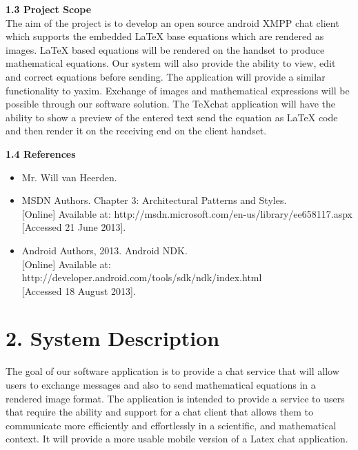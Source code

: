 \documentclass[29pt,a4paper]{moderncv}
\begin{document}
		\noindent \textbf{1.3 Project Scope}
			\\The aim of the project is to develop an open source android XMPP chat client which supports the embedded LaTeX base equations which are rendered as images. LaTeX based equations will be rendered on the handset to produce mathematical equations. Our system will also provide the ability to view, edit and correct equations before sending.
			\parindent 5mm The application will provide a similar functionality to yaxim. Exchange of images and mathematical expressions will be possible through our software solution. The TeXchat application will have the ability to show a preview of the entered text send the equation as LaTeX code and then render it on the receiving end on the client handset.
			
		\vspace{5mm}
		
	\noindent \textbf{1.4 References}
		\begin{itemize}
		\item Mr. Will van Heerden.
			\item MSDN Authors. Chapter 3: Architectural Patterns and Styles. 
			\\{[Online]} Available at: http://msdn.microsoft.com/en-us/library/ee658117.aspx
			\\{[Accessed 21 June 2013].}
			
			\item Android Authors, 2013. Android NDK.\\ {[Online]} Available at: http://developer.android.com/tools/sdk/ndk/index.html
				\\{[Accessed 18 August 2013].}
		\end{itemize}
		\vspace{5mm}
		
\newpage
	\section*{\textbf{2. System Description}}
	\vspace{4mm}
		\noindent The goal of our software application is to provide a chat service that will allow users to exchange messages and also to send mathematical equations in a rendered image format.  The application is intended to provide a service to users that require the ability and support for a chat client that allows them to communicate more efficiently and effortlessly in a scientific, and mathematical context.  It will provide a more usable mobile version of a Latex chat application.\\ 
		
\end{document}
